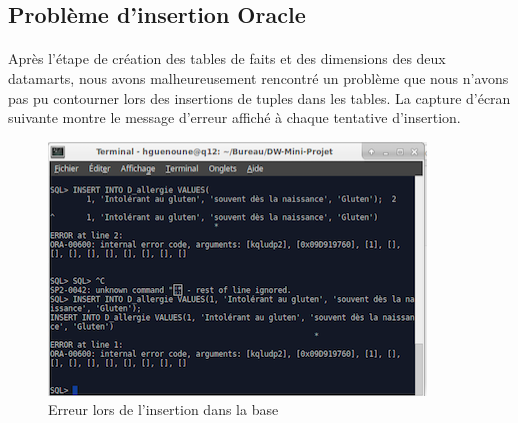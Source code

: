 \newpage

\subsection{Problème d'insertion Oracle} 
\paragraph{} Après l’étape de création des tables de faits et des dimensions des deux datamarts, nous avons malheureusement rencontré un problème que nous n’avons pas pu contourner lors des insertions de tuples dans les tables. La capture d’écran suivante montre le message d’erreur affiché à chaque tentative d’insertion.


    \begin{figure}[h]
        \centerline{\includegraphics[scale=0.7]{error.png}}
        \caption{Erreur lors de l'insertion dans la base}
        \label{fig:UML}
    \end{figure}
